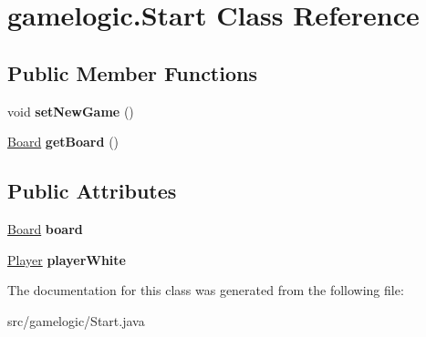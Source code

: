 \hypertarget{classgamelogic_1_1_start}{}\section{gamelogic.\+Start Class Reference}
\label{classgamelogic_1_1_start}
\subsection*{Public Member Functions}
\begin{DoxyCompactItemize}
\item 
\mbox{\label{classgamelogic_1_1_start_a161eefcd26dc8dce8a27a8b73f1285b4}} 
void {\bfseries set\+New\+Game} ()
\item 
\mbox{\label{classgamelogic_1_1_start_adc13d7ee88e45fc4a76192358521c88d}} 
\mbox{\hyperlink{classgamelogic_1_1_board}{Board}} {\bfseries get\+Board} ()
\end{DoxyCompactItemize}
\subsection*{Public Attributes}
\begin{DoxyCompactItemize}
\item 
\mbox{\label{classgamelogic_1_1_start_a2ac837ad7b528d4a29aa72917a46c654}} 
\mbox{\hyperlink{classgamelogic_1_1_board}{Board}} {\bfseries board}
\item 
\mbox{\label{classgamelogic_1_1_start_aaab56a58607a3cb8d8e326c3c475fa0e}} 
\mbox{\hyperlink{classgamelogic_1_1_player}{Player}} {\bfseries player\+White}
\end{DoxyCompactItemize}


The documentation for this class was generated from the following file\+:\begin{DoxyCompactItemize}
\item 
src/gamelogic/Start.\+java\end{DoxyCompactItemize}
